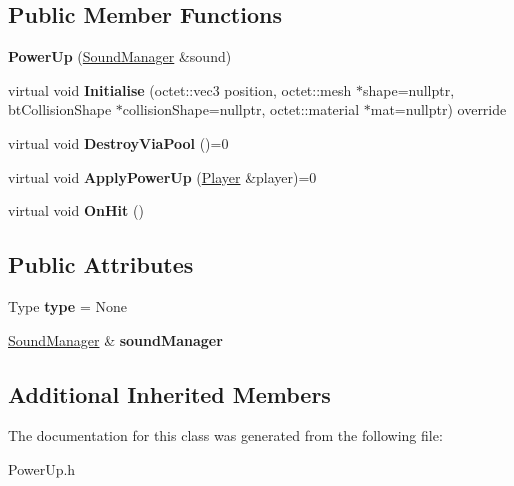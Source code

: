 \subsection*{Public Member Functions}
\begin{DoxyCompactItemize}
\item 
\hypertarget{class_arena_1_1_power_up_ab3ba840a761a2c74bef3ec70cf820d72}{{\bfseries Power\+Up} (\hyperlink{class_arena_1_1_sound_manager}{Sound\+Manager} \&sound)}\label{class_arena_1_1_power_up_ab3ba840a761a2c74bef3ec70cf820d72}

\item 
\hypertarget{class_arena_1_1_power_up_ae32a5c5731883069ceacbf22e7b9c563}{virtual void {\bfseries Initialise} (octet\+::vec3 position, octet\+::mesh $\ast$shape=nullptr, bt\+Collision\+Shape $\ast$collision\+Shape=nullptr, octet\+::material $\ast$mat=nullptr) override}\label{class_arena_1_1_power_up_ae32a5c5731883069ceacbf22e7b9c563}

\item 
\hypertarget{class_arena_1_1_power_up_aae80c77c0100cf7ed9be1e3428b90e17}{virtual void {\bfseries Destroy\+Via\+Pool} ()=0}\label{class_arena_1_1_power_up_aae80c77c0100cf7ed9be1e3428b90e17}

\item 
\hypertarget{class_arena_1_1_power_up_a578f67f7e6b88b187079eed80b90933d}{virtual void {\bfseries Apply\+Power\+Up} (\hyperlink{class_arena_1_1_player}{Player} \&player)=0}\label{class_arena_1_1_power_up_a578f67f7e6b88b187079eed80b90933d}

\item 
\hypertarget{class_arena_1_1_power_up_ac60bdf4dc0d948a070d9368cdae7d819}{virtual void {\bfseries On\+Hit} ()}\label{class_arena_1_1_power_up_ac60bdf4dc0d948a070d9368cdae7d819}

\end{DoxyCompactItemize}
\subsection*{Public Attributes}
\begin{DoxyCompactItemize}
\item 
\hypertarget{class_arena_1_1_power_up_afff03dc08d9ec518ce5f0426e8b2d77a}{Type {\bfseries type} = None}\label{class_arena_1_1_power_up_afff03dc08d9ec518ce5f0426e8b2d77a}

\item 
\hypertarget{class_arena_1_1_power_up_aa35bfa4bcdabd8c19b2de349bf5f9b77}{\hyperlink{class_arena_1_1_sound_manager}{Sound\+Manager} \& {\bfseries sound\+Manager}}\label{class_arena_1_1_power_up_aa35bfa4bcdabd8c19b2de349bf5f9b77}

\end{DoxyCompactItemize}
\subsection*{Additional Inherited Members}


The documentation for this class was generated from the following file\+:\begin{DoxyCompactItemize}
\item 
Power\+Up.\+h\end{DoxyCompactItemize}
